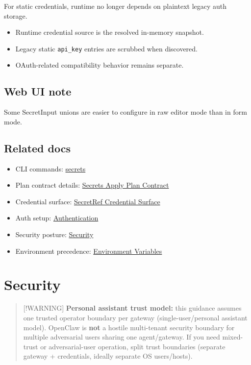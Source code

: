 For static credentials, runtime no longer depends on plaintext legacy auth storage.

\begin{itemize}
  \item Runtime credential source is the resolved in-memory snapshot.
  \item Legacy static \texttt{api\_key} entries are scrubbed when discovered.
  \item OAuth-related compatibility behavior remains separate.
\end{itemize}


\subsection{Web UI note}


Some SecretInput unions are easier to configure in raw editor mode than in form mode.

\subsection{Related docs}


\begin{itemize}
  \item CLI commands: \href{/cli/secrets}{secrets}
  \item Plan contract details: \href{/gateway/secrets-plan-contract}{Secrets Apply Plan Contract}
  \item Credential surface: \href{/reference/secretref-credential-surface}{SecretRef Credential Surface}
  \item Auth setup: \href{/gateway/authentication}{Authentication}
  \item Security posture: \href{/gateway/security}{Security}
  \item Environment precedence: \href{/help/environment}{Environment Variables}
\end{itemize}



\clearpage

\section{Security}


\begin{quote}
[!WARNING]
\textbf{Personal assistant trust model:} this guidance assumes one trusted operator boundary per gateway (single-user/personal assistant model).
OpenClaw is \textbf{not} a hostile multi-tenant security boundary for multiple adversarial users sharing one agent/gateway.
If you need mixed-trust or adversarial-user operation, split trust boundaries (separate gateway + credentials, ideally separate OS users/hosts).
\end{quote}


